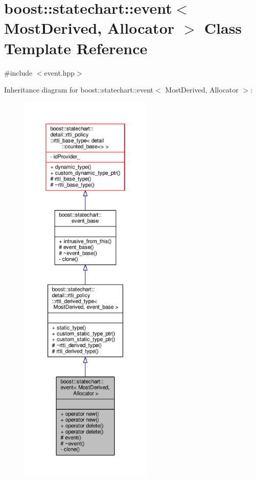 \hypertarget{classboost_1_1statechart_1_1event}{}\section{boost\+:\+:statechart\+:\+:event$<$ Most\+Derived, Allocator $>$ Class Template Reference}
\label{classboost_1_1statechart_1_1event}


{\ttfamily \#include $<$event.\+hpp$>$}



Inheritance diagram for boost\+:\+:statechart\+:\+:event$<$ Most\+Derived, Allocator $>$\+:
\nopagebreak
\begin{figure}[H]
\begin{center}
\leavevmode
\includegraphics[height=550pt]{classboost_1_1statechart_1_1event__inherit__graph}
\end{center}
\end{figure}


